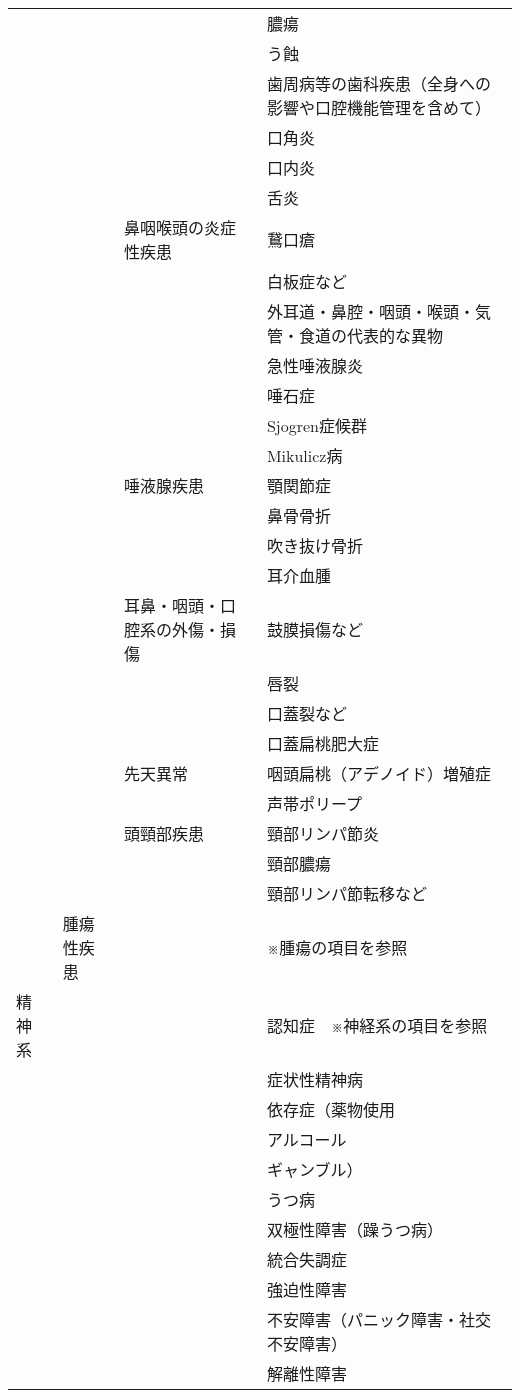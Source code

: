 \begin{xltabular}{\linewidth}{XXXX}
 &  &  & 膿瘍 \\
 &  &  & う蝕 \\
 &  &  & 歯周病等の歯科疾患（全身への影響や口腔機能管理を含めて） \\
 &  &  & 口角炎 \\
 &  &  & 口内炎 \\
 &  &  & 舌炎 \\
 &  & 鼻咽喉頭の炎症性疾患 & 鵞口瘡 \\
 &  &  & 白板症など \\
 &  &  & 外耳道・鼻腔・咽頭・喉頭・気管・食道の代表的な異物 \\
 &  &  & 急性唾液腺炎 \\
 &  &  & 唾石症 \\
 &  &  & Sjogren症候群 \\
 &  &  & Mikulicz病 \\
 &  & 唾液腺疾患 & 顎関節症 \\
 &  &  & 鼻骨骨折 \\
 &  &  & 吹き抜け骨折 \\
 &  &  & 耳介血腫 \\
 &  & 耳鼻・咽頭・口腔系の外傷・損傷 & 鼓膜損傷など \\
 &  &  & 唇裂 \\
 &  &  & 口蓋裂など \\
 &  &  & 口蓋扁桃肥大症 \\
 &  & 先天異常 & 咽頭扁桃（アデノイド）増殖症 \\
 &  &  & 声帯ポリープ \\
 &  & 頭頸部疾患 & 頸部リンパ節炎 \\
 &  &  & 頸部膿瘍 \\
 &  &  & 頸部リンパ節転移など \\
 & 腫瘍性疾患 &  & ※腫瘍の項目を参照 \\
精神系 &  &  & 認知症　※神経系の項目を参照 \\
 &  &  & 症状性精神病 \\
 &  &  & 依存症（薬物使用 \\
 &  &  & アルコール \\
 &  &  & ギャンブル） \\
 &  &  & うつ病 \\
 &  &  & 双極性障害（躁うつ病） \\
 &  &  & 統合失調症 \\
 &  &  & 強迫性障害 \\
 &  &  & 不安障害（パニック障害・社交不安障害） \\
 &  &  & 解離性障害 \\

\end{xltabular}
